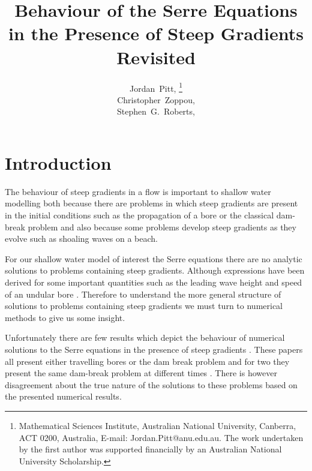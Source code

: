 \documentclass[SingleSpace,12pt,Proceedings]{Serre_ASCE}
\begin{document}
\title{Behaviour of the Serre Equations in the Presence of Steep Gradients Revisited}

\author{
Jordan~Pitt,%
\thanks{Mathematical Sciences Institute, Australian National University, Canberra, ACT 0200, Australia, E-mail: Jordan.Pitt@anu.edu.au. The work undertaken by the first author was supported financially by an Australian National University Scholarship.}
\\
Christopher~Zoppou,\footnotemark[1]%
%
\\
Stephen~G.~Roberts,\footnotemark[1]
}

\maketitle

\begin{abstract}

\end{abstract}


\linenumbers

\section{Introduction} \label{intro} 
The behaviour of steep gradients in a flow is important to shallow water modelling both because there are problems in which steep gradients are present in the initial conditions such as the propagation of a bore or the classical dam-break problem and also because some problems develop steep gradients as they evolve such as shoaling waves on a beach. 

For our shallow water model of interest the Serre equations there are no analytic solutions to problems containing steep gradients. Although expressions have been derived for some important quantities such as the leading wave height and speed of an undular bore \cite{El-etal-2006}. Therefore to understand the more general structure of solutions to problems containing steep gradients we must turn to numerical methods to give us some insight. 

Unfortunately there are few results which depict the behaviour of numerical solutions to the Serre equations in the presence of steep gradients \cite{El-etal-2006,Hank-etal-2010-2034,Mitsotakis-etal-2014,Dutykh-2014-315}. These papers all present either travelling bores or the dam break problem and for two they present the same dam-break problem at different times \cite{El-etal-2006,Hank-etal-2010-2034}. There is however disagreement about the true nature of the solutions to these problems based on the presented numerical results. 
\end{document}
